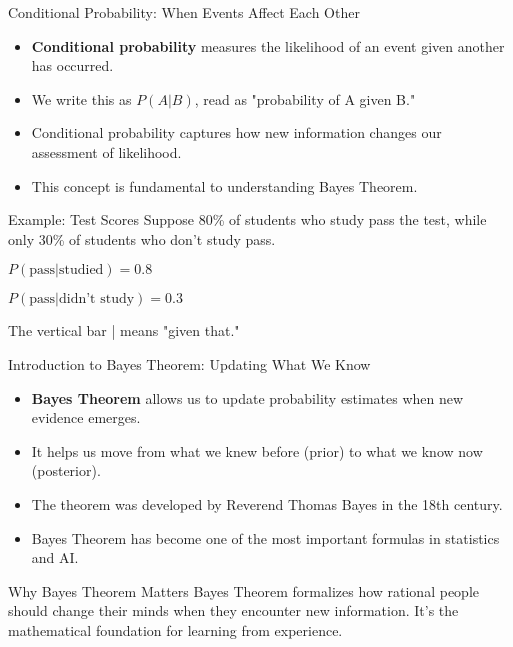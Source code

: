 \documentclass{beamer}
\begin{document}
	\begin{frame}{Conditional Probability: When Events Affect Each Other}
		\begin{itemize}
			\item \textbf{Conditional probability} measures the likelihood of an event given another has occurred.
			\item We write this as $P(A|B)$, read as "probability of A given B."
			\item Conditional probability captures how new information changes our assessment of likelihood.
			\item This concept is fundamental to understanding Bayes Theorem.
		\end{itemize}
		
		\begin{exampleblock}{Example: Test Scores}
			Suppose 80\% of students who study pass the test, while only 30\% of students who don't study pass.
			
			$P(\text{pass}|\text{studied}) = 0.8$
			
			$P(\text{pass}|\text{didn't study}) = 0.3$
			
			The vertical bar | means "given that."
		\end{exampleblock}
	\end{frame}
	
	\begin{frame}{Introduction to Bayes Theorem: Updating What We Know}
		\begin{itemize}
			\item \textbf{Bayes Theorem} allows us to update probability estimates when new evidence emerges.
			\item It helps us move from what we knew before (prior) to what we know now (posterior).
			\item The theorem was developed by Reverend Thomas Bayes in the 18th century.
			\item Bayes Theorem has become one of the most important formulas in statistics and AI.
		\end{itemize}
		
		\begin{alertblock}{Why Bayes Theorem Matters}
			Bayes Theorem formalizes how rational people should change their minds when they encounter new information. It's the mathematical foundation for learning from experience.
		\end{alertblock}
	\end{frame}
	
\end{document}
